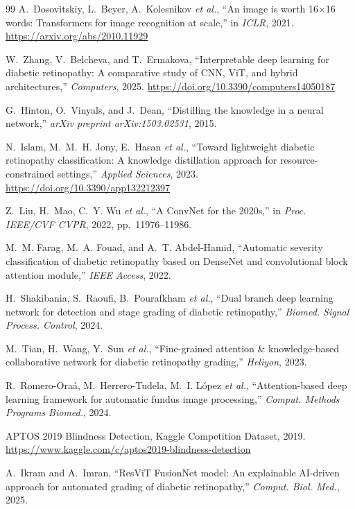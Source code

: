 \documentclass[10pt, twocolumn]{article}
\begin{document}
\begin{thebibliography}{99}
A.~Dosovitskiy, L.~Beyer, A.~Kolesnikov \textit{et al.}, ``An image is worth 16$\times$16 words: Transformers for image recognition at scale,'' in \textit{ICLR}, 2021. \url{https://arxiv.org/abs/2010.11929}

W.~Zhang, V.~Belcheva, and T.~Ermakova, ``Interpretable deep learning for diabetic retinopathy: A comparative study of CNN, ViT, and hybrid architectures,'' \textit{Computers}, 2025. \url{https://doi.org/10.3390/computers14050187}

G.~Hinton, O.~Vinyals, and J.~Dean, ``Distilling the knowledge in a neural network,'' \textit{arXiv preprint arXiv:1503.02531}, 2015.

N.~Islam, M.~M.~H. Jony, E.~Hasan \textit{et al.}, ``Toward lightweight diabetic retinopathy classification: A knowledge distillation approach for resource-constrained settings,'' \textit{Applied Sciences}, 2023. \url{https://doi.org/10.3390/app132212397}

Z.~Liu, H.~Mao, C.~Y. Wu \textit{et al.}, ``A ConvNet for the 2020s,'' in \textit{Proc. IEEE/CVF CVPR}, 2022, pp.~11976--11986.

M.~M. Farag, M.~A. Fouad, and A.~T. Abdel-Hamid, ``Automatic severity classification of diabetic retinopathy based on DenseNet and convolutional block attention module,'' \textit{IEEE Access}, 2022.

H.~Shakibania, S.~Raoufi, B.~Pourafkham \textit{et al.}, ``Dual branch deep learning network for detection and stage grading of diabetic retinopathy,'' \textit{Biomed. Signal Process. Control}, 2024.

M.~Tian, H.~Wang, Y.~Sun \textit{et al.}, ``Fine-grained attention \& knowledge-based collaborative network for diabetic retinopathy grading,'' \textit{Heliyon}, 2023.

R.~Romero-Ora\'a, M.~Herrero-Tudela, M.~I. L\'opez \textit{et al.}, ``Attention-based deep learning framework for automatic fundus image processing,'' \textit{Comput. Methods Programs Biomed.}, 2024.

APTOS 2019 Blindness Detection, Kaggle Competition Dataset, 2019. \url{https://www.kaggle.com/c/aptos2019-blindness-detection}

A.~Ikram and A.~Imran, ``ResViT FusionNet model: An explainable AI-driven approach for automated grading of diabetic retinopathy,'' \textit{Comput. Biol. Med.}, 2025.


\end{thebibliography}
\end{document}
